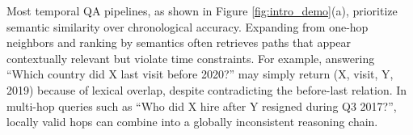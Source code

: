 



Most temporal QA pipelines\cite{jia2024faithful,T4, ARI}, as shown in Figure \ref{fig:intro_demo}(a), prioritize semantic similarity over chronological accuracy.  
Expanding from one-hop neighbors and ranking by semantics often retrieves paths that appear contextually relevant but violate time constraints.  
For example, answering “Which country did X last visit before 2020?” may simply return (X, visit, Y, 2019) because of lexical overlap, despite contradicting the before-last relation.  
In multi-hop queries such as “Who did X hire after Y resigned during Q3 2017?”, locally valid hops can combine into a globally inconsistent reasoning chain.

